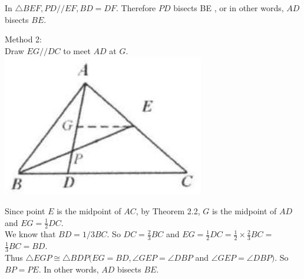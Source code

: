 \documentclass{article}
\begin{document}
In \(\triangle B E F, P D / / E F, B D=D F\). Therefore \(P D\) bisects BE , or in other words, \(A D\) bisects \(B E\).

Method 2:\\
Draw \(E G / / D C\) to meet \(A D\) at \(G\).\\
\centering
\includegraphics[width=\textwidth]{images/036(3).jpg}


Since point \(E\) is the midpoint of \(A C\), by Theorem 2.2, \(G\) is the midpoint of \(A D\) and \(E G=\frac{1}{2} D C\).\\
We know that \(B D=1 / 3 B C\). So \(D C=\frac{2}{3} B C\) and \(E G=\frac{1}{2} D C=\frac{1}{2} \times \frac{2}{3} B C=\) \(\frac{1}{3} B C=B D\).\\
Thus \(\triangle E G P \cong \triangle B D P(E G=B D, \angle G E P=\angle D B P\) and \(\angle G E P=\angle D B P)\). So \(B P=P E\). In other words, \(A D\) bisects \(B E\).
\end{document}
